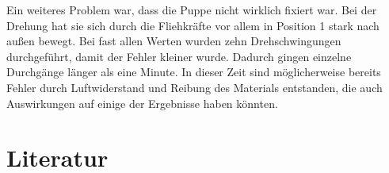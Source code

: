     Ein weiteres Problem war, dass die Puppe nicht wirklich fixiert war. Bei der Drehung hat sie sich durch die Fliehkräfte vor allem in Position 1 stark nach außen bewegt. 
    Bei fast allen Werten wurden zehn Drehschwingungen durchgeführt, damit der Fehler kleiner wurde. Dadurch gingen einzelne Durchgänge länger als eine Minute. In dieser Zeit sind möglicherweise bereits Fehler durch Luftwiderstand und Reibung des Materials entstanden, die auch Auswirkungen auf einige der Ergebnisse haben könnten.



    \section{Literatur}
    
